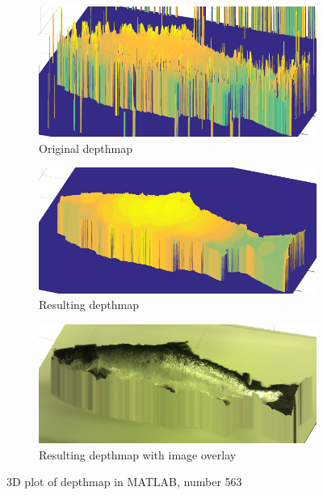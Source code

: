 \begin{figure}[H]
    \centering
    \begin{subfigure}{1\textwidth}
        \centering
        \includegraphics[width=.9\linewidth]{images/results/3D_plots/original_3D_63}
        \caption{Original depthmap} 
        \label{fig:3D_original_63}
    \end{subfigure}\hspace*{\fill}
    
    \medskip
    \begin{subfigure}{1\textwidth}
        \centering
        \includegraphics[width=.9\linewidth]{images/results/3D_plots/fixed_3D_63}
        \caption{Resulting depthmap} 
        \label{fig:3D_fixed_63}
    \end{subfigure}\hspace*{\fill}
    
    \medskip
    \begin{subfigure}{1\textwidth}
        \centering
        \includegraphics[width=.9\linewidth]{images/results/3D_plots/fixed_3D_fish_63}
        \caption{Resulting depthmap with image overlay} 
        \label{fig:3D_fixed_fish_63}
    \end{subfigure}\hspace*{\fill}
    \caption{3D plot of depthmap in MATLAB, number 563}
    \label{fig:3D_plot_63}
\end{figure}



